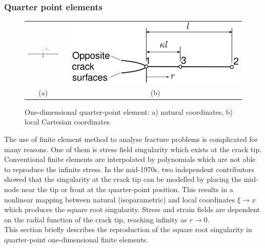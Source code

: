 \documentclass[11pt]{acmeArticle}
\numberwithin{equation}{section}
\begin{document}
\subsubsection{Quarter point elements} %
\begin{figure}[h!]
\begin{center}
\begin{tabular}{c c c}
\includegraphics[height=1.3cm]{Figures/StandardElement.pdf} &   & \includegraphics[height=2.cm]{Figures/QuarterPoint.pdf}  \\  
 (a) & & (b)
\end{tabular}
\caption{One-dimensional quarter-point element: a) natural coordinates, b) local Cartesian coordinates}
\label{fig:1d-quarter}
\end{center}
\end{figure}
The use of finite element method to analyse fracture problems is complicated for many reasons. One of them is stress field singularity which exists at the crack tip.
Conventional finite elements are interpolated by polynomials which are not able to reproduce the infinite stress. In the mid-1970s, two independent contributors \citep{barsoum1976use,henshell1975crack} showed that the singularity at the crack tip can be modelled by placing the mid-node near the tip or front at the quarter-point position. This results in a nonlinear mapping between natural (isoparametric) and local coordinates $\xi \rightarrow x$ which produces the square root singularity. Stress and strain fields are dependent on the radial function of the crack tip, reaching infinity as $ r \rightarrow 0$. \\
This section briefly describes the reproduction of the square root singularity in quarter-point one-dimensional finite elements. 
\end{document}
